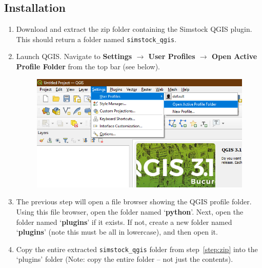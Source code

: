 \documentclass{article}
\begin{document}
\subsection{Installation}
\label{section:installation}
\begin{enumerate}
    \item Download and extract the zip folder containing the Simstock QGIS plugin. This should return a folder named \texttt{simstock\_qgis}. \label{step:zip} %
    
    \item Launch QGIS. Navigate to \textbf{Settings $\rightarrow$ User Profiles $\rightarrow$ Open Active Profile Folder} from the top bar (see below). \label{step:profilefolder}
    \begin{figure}[h!]
        \centering
        \includegraphics[width=12cm]{profile_folder.png}
        \label{fig:profile_folder}
    \end{figure}
    \item The previous step will open a file browser showing the QGIS profile folder. Using this file browser, open the folder named `\textbf{python}'. Next, open the folder named `\textbf{plugins}' if it exists. If not, create a new folder named `\textbf{plugins}' (note this must be all in lowercase), and then open it. \label{step:pluginsdir}
    
    \item Copy the entire extracted \texttt{simstock\_qgis} folder from step~\ref{step:zip} into the `plugins' folder (Note: copy the entire folder -- not just the contents).
    

\end{enumerate}
\end{document}
